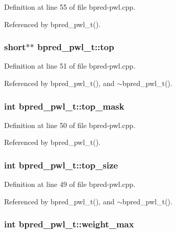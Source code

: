 Definition at line 55 of file bpred-pwl.cpp.

Referenced by bpred\_\-pwl\_\-t().
\subsubsection[{top}]{\setlength{\rightskip}{0pt plus 5cm}short$\ast$$\ast$ {\bf bpred\_\-pwl\_\-t::top}\hspace{0.3cm}{\tt  [protected]}}\label{classbpred__pwl__t_bfb9b90d407efc7d245b7195f618add5}




Definition at line 51 of file bpred-pwl.cpp.

Referenced by bpred\_\-pwl\_\-t(), and $\sim$bpred\_\-pwl\_\-t().
\subsubsection[{top\_\-mask}]{\setlength{\rightskip}{0pt plus 5cm}int {\bf bpred\_\-pwl\_\-t::top\_\-mask}\hspace{0.3cm}{\tt  [protected]}}\label{classbpred__pwl__t_fda8e6872beed41ece358fe9b1df3743}




Definition at line 50 of file bpred-pwl.cpp.

Referenced by bpred\_\-pwl\_\-t().
\subsubsection[{top\_\-size}]{\setlength{\rightskip}{0pt plus 5cm}int {\bf bpred\_\-pwl\_\-t::top\_\-size}\hspace{0.3cm}{\tt  [protected]}}\label{classbpred__pwl__t_8c546c567fc645bc3ff4bb9b728ba920}




Definition at line 49 of file bpred-pwl.cpp.

Referenced by bpred\_\-pwl\_\-t(), and $\sim$bpred\_\-pwl\_\-t().
\subsubsection[{weight\_\-max}]{\setlength{\rightskip}{0pt plus 5cm}int {\bf bpred\_\-pwl\_\-t::weight\_\-max}\hspace{0.3cm}{\tt  [protected]}}\label{classbpred__pwl__t_5fcb694facf46118e00d5d2cbc7a78c9}




